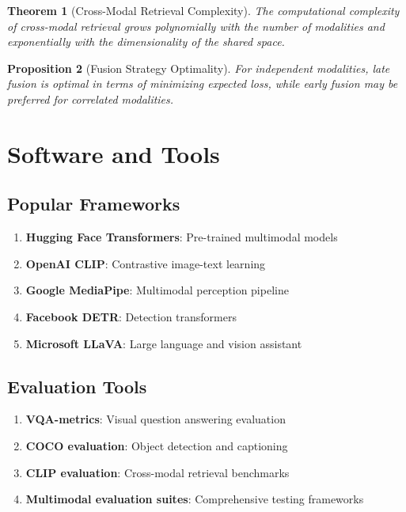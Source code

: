 \documentclass[11pt,a4paper]{article}
\newtheorem{theorem}{Theorem}[section]
\newtheorem{proposition}[theorem]{Proposition}
\begin{document}
\begin{theorem}[Cross-Modal Retrieval Complexity]
The computational complexity of cross-modal retrieval grows polynomially with the number of modalities and exponentially with the dimensionality of the shared space.
\end{theorem}

\begin{proposition}[Fusion Strategy Optimality]
For independent modalities, late fusion is optimal in terms of minimizing expected loss, while early fusion may be preferred for correlated modalities.
\end{proposition}

\section{Software and Tools}

\subsection{Popular Frameworks}

\begin{enumerate}
\item \textbf{Hugging Face Transformers}: Pre-trained multimodal models
\item \textbf{OpenAI CLIP}: Contrastive image-text learning
\item \textbf{Google MediaPipe}: Multimodal perception pipeline
\item \textbf{Facebook DETR}: Detection transformers
\item \textbf{Microsoft LLaVA}: Large language and vision assistant
\end{enumerate}

\subsection{Evaluation Tools}

\begin{enumerate}
\item \textbf{VQA-metrics}: Visual question answering evaluation
\item \textbf{COCO evaluation}: Object detection and captioning
\item \textbf{CLIP evaluation}: Cross-modal retrieval benchmarks
\item \textbf{Multimodal evaluation suites}: Comprehensive testing frameworks
\end{enumerate}
\end{document}
